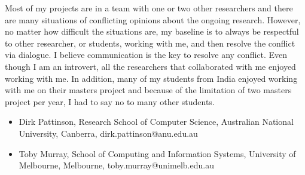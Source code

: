 \documentclass[11pt,a4paper,roman]{moderncv}
\begin{document}
Most of my projects are in a team with one or two other researchers and there are
many situations of conflicting opinions about the ongoing research. However, no matter 
how difficult the situations are, my baseline is to always be respectful to other 
researcher, or students, working with me, and then resolve the conflict via dialogue. I believe
communication is the key to resolve any conflict. Even though I am an introvert, 
all the researchers that collaborated with me 
enjoyed working with me. In addition, many of my students from India enjoyed working with 
me on their masters project and because of the limitation of two masters project per year, 
I had to say no to many other students.


\vspace{0.5cm}
{\begin{itemize}\item Dirk Pattinson, Research School of Computer Science, Australian National University, Canberra, dirk.pattinson@anu.edu.au
\end{itemize}}
{\begin{itemize}\item Toby Murray, School of Computing and Information Systems, University of Melbourne, Melbourne, toby.murray@unimelb.edu.au
\end{itemize}}




\vspace{0.5cm}


\makeletterclosing
\end{document}
